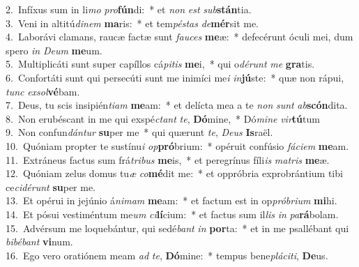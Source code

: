 {2.~}Infíxus sum in li\textit{mo} \textit{pro}\textbf{fún}di:~* et \textit{non} \textit{est} \textit{sub}\textbf{stán}tia.\\
{3.~}Veni in altitú\textit{di}\textit{nem} \textbf{ma}ris:~* et tem\textit{pé}\textit{stas} \textit{de}\textbf{mér}sit me.\\
{4.~}Laborávi clamans, raucæ factæ sunt \textit{fau}\textit{ces} \textbf{me}æ:~* defecérunt óculi mei, dum spero \textit{in} \textit{De}\textit{um} \textbf{me}um.\\
{5.~}Multiplicáti sunt super capíllos cá\textit{pi}\textit{tis} \textbf{me}i,~* qui o\textit{dé}\textit{runt} \textit{me} \textbf{gra}tis.\\
{6.~}Confortáti sunt qui persecúti sunt me inimíci me\textit{i} \textit{in}\textbf{jú}ste:~* quæ non rápui, \textit{tunc} \textit{ex}\textit{sol}\textbf{vé}bam.\\
{7.~}Deus, tu scis insipién\textit{ti}\textit{am} \textbf{me}am:~* et delícta mea a te \textit{non} \textit{sunt} \textit{ab}\textbf{scón}dita.\\
{8.~}Non erubéscant in me qui exspé\textit{ctant} \textit{te}, \textbf{Dó}mine,~* Dó\textit{mi}\textit{ne} \textit{vir}\textbf{tú}tum\\
{9.~}Non confun\textit{dán}\textit{tur} \textbf{su}per me~* qui quærunt \textit{te}, \textit{De}\textit{us} \textbf{Is}raël.\\
{10.~}Quóniam propter te sustínu\textit{i} \textit{op}\textbf{pró}brium:~* opéruit confúsio \textit{fá}\textit{ci}\textit{em} \textbf{me}am.\\
{11.~}Extráneus factus sum frá\textit{tri}\textit{bus} \textbf{me}is,~* et peregrínus fíli\textit{is} \textit{ma}\textit{tris} \textbf{me}æ.\\
{12.~}Quóniam zelus domus tu\textit{æ} \textit{co}\textbf{mé}dit me:~* et oppróbria exprobrántium tibi ce\textit{ci}\textit{dé}\textit{runt} \textbf{su}per me.\\
{13.~}Et opérui in jejúnio á\textit{ni}\textit{mam} \textbf{me}am:~* et factum est in op\textit{pró}\textit{bri}\textit{um} \textbf{mi}hi.\\
{14.~}Et pósui vestiméntum me\textit{um} \textit{ci}\textbf{lí}cium:~* et factus sum il\textit{lis} \textit{in} \textit{pa}\textbf{rá}bolam.\\
{15.~}Advérsum me loquebántur, qui sedé\textit{bant} \textit{in} \textbf{por}ta:~* et in me psallébant qui \textit{bi}\textit{bé}\textit{bant} \textbf{vi}num.\\
{16.~}Ego vero oratiónem meam \textit{ad} \textit{te}, \textbf{Dó}mine:~* tempus bene\textit{plá}\textit{ci}\textit{ti}, \textbf{De}us.\\
